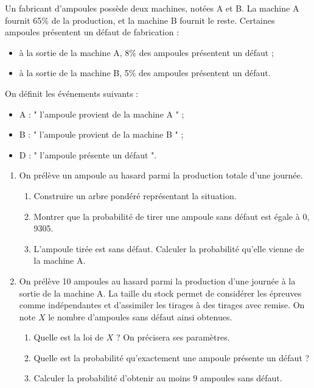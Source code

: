 \documentclass[11pt,fleqn, openany]{book} %
\begin{document}
\begin{exercise}[subtitle={(Antilles - Guyane 2016)}]

Un fabricant d'ampoules possède deux machines, notées A et B. La machine A fournit 65\% de la production, et la machine B fournit le reste. Certaines ampoules présentent un défaut de fabrication :
\begin{itemize}
\item à la sortie de la machine A, 8\% des ampoules présentent un défaut ;
\item à la sortie de la machine B, 5\% des ampoules présentent un défaut.\end{itemize}
On définit les événements suivants :
\begin{itemize}
\item A : " l'ampoule provient de la machine A " ;
\item B : " l'ampoule provient de la machine B " ;
\item D : " l'ampoule présente un défaut ".
\end{itemize}
\begin{enumerate}
\item On prélève un ampoule au hasard parmi la production totale d'une journée.
\begin{enumerate}
\item Construire un arbre pondéré représentant la situation.
\item Montrer que la probabilité de tirer une ampoule sans défaut est égale à 0, 9305.
\item L'ampoule tirée est sans défaut. Calculer la probabilité qu'elle vienne de la machine A.
\end{enumerate}
\item On prélève 10 ampoules au hasard parmi la production d'une journée à la sortie de la machine A. La taille du stock permet de considérer les épreuves comme indépendantes et d'assimiler les tirages à des tirages avec remise. On note $X$ le nombre d'ampoules sans défaut ainsi obtenues.
\begin{enumerate}
\item Quelle est la loi de $X$ ? On précisera ses paramètres.
\item Quelle est la probabilité qu'exactement une ampoule présente un défaut ?
\item Calculer la probabilité d'obtenir au moins 9 ampoules sans défaut.
\end{enumerate}

\end{enumerate}\end{exercise}
\end{document}

